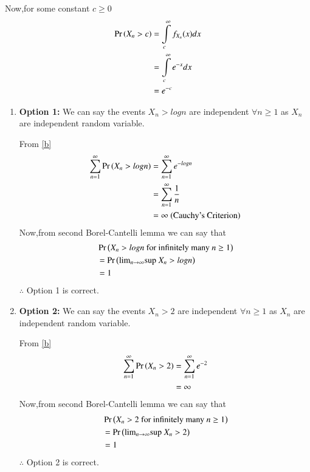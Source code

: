 \documentclass[journal,12pt,twocolumn]{IEEEtran}
\begin{document}
Now,for some constant $c\geq0$
\begin{align}
    \Pr\left(X_n>c\right)&=\int\limits_{c}^{\infty}f_{X_n}(x)dx\nonumber\\
              &=\int\limits_{c}^{\infty}e^{-x}dx\nonumber\\
              &=e^{-c}\label{b}
\end{align}
\begin{enumerate}
    \item \textbf{Option 1:} 
    We can say the events $X_n>log n$ are independent $\forall n\geq 1$ as $X_n$ are independent random variable.
    
    From \eqref{b}
    \begin{align}
        \sum_{n=1}^{\infty}\Pr\left(X_n > log n\right) &=\sum_{n=1}^{\infty}e^{-logn}\nonumber\\ &=\sum_{n=1}^{\infty}\frac{1}{n}\nonumber\\
                                            &= \infty  \text{ (Cauchy's Criterion)}\nonumber
    \end{align}
    Now,from second Borel-Cantelli lemma we can say that
    \begin{align}
        &\Pr\left(X_n>logn \text{ for infinitely many }n\geq1\right)\nonumber\\
        &=\Pr\left(\text{lim}_{n \rightarrow \infty}\text{sup }X_n>logn\right)\nonumber\\
        &=1\nonumber
    \end{align}
    $\therefore$ Option 1 is correct. 
    
    \item\textbf{Option 2:} We can say the events $X_n>2$ are independent $\forall n\geq 1$ as $X_n$ are independent random variable.
    
    From \eqref{b}
    \begin{align}
        \sum_{n=1}^{\infty}\Pr\left(X_n > 2\right) &= \sum_{n=1}^{\infty}e^{-2}\nonumber\\
                                            &= \infty\nonumber
    \end{align}
    Now,from second Borel-Cantelli lemma we can say that
    \begin{align}
        &\Pr\left(X_n>2 \text{ for infinitely many }n\geq1\right)\nonumber\\
        &=\Pr\left(\text{lim}_{n \rightarrow \infty}\text{sup }X_n>2\right)\nonumber\\
        &=1\nonumber
    \end{align}
    $\therefore$ Option 2 is correct.
    

\end{enumerate}
\end{document}

